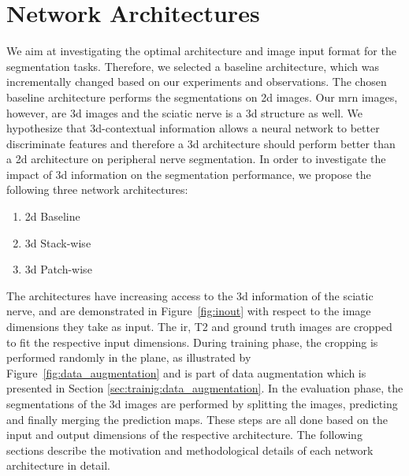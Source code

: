 \section{Network Architectures} \label{sec:architecture}
We aim at investigating the optimal architecture and image input format for the segmentation tasks. Therefore, we selected a baseline architecture, which was incrementally changed based on our experiments and observations. The chosen baseline architecture performs the segmentations on \gls{2d} images. Our \gls{mrn} images, however, are \gls{3d} images and the sciatic nerve is a \gls{3d} structure as well. We hypothesize that \gls{3d}-contextual information allows a neural network to better discriminate features and therefore a \gls{3d} architecture should perform better than a \gls{2d} architecture on peripheral nerve segmentation. In order to investigate the impact of \gls{3d} information on the segmentation performance, we propose the following three network architectures:
\begin{enumerate}
  \item \gls{2d} Baseline
  \item \gls{3d} Stack-wise
  \item \gls{3d} Patch-wise
\end{enumerate}
The architectures have increasing access to the \gls{3d} information of the sciatic nerve, and are demonstrated in Figure~\ref{fig:inout} with respect to the image dimensions they take as input. The \gls{ir}, T2 and ground truth images are cropped to fit the respective input dimensions. During training phase, the cropping is performed randomly in the plane, as illustrated by Figure~\ref{fig:data_augmentation} and is part of data augmentation which is presented in Section \ref{sec:trainig:data_augmentation}. In the evaluation phase, the segmentations of the \gls{3d} images are performed by splitting the images, predicting and finally merging the prediction maps. These steps are all done based on the input and output dimensions of the respective architecture. The following sections describe the motivation and methodological details of each network architecture in detail.

